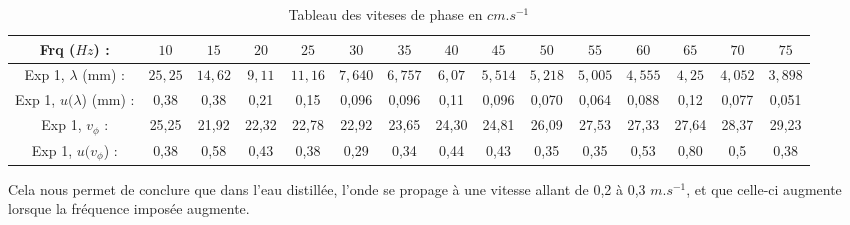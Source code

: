 \documentclass{report}
\begin{document}
\begin{table}[H]
\centering
\caption{Tableau des viteses de phase en $cm.s^{-1}$}
\label{tab:vphi}
\scriptsize{\begin{tabular}{c|c|c|c|c|c|c|c|c|c|c|c|c|c|c}
    Frq ($Hz$) : &  $10$ & $15$ & $20$ & $25$ & $30$ & $35$ & $40$ & $45$ & $50$ & $55$ & $60$ & $65$ & $70$ & $75$ \\
    \hline
    Exp 1, $\lambda$ (mm) : & $25,25$ & $14,62$ & $9,11$ & $11,16$ & $7,640$ & $6,757$ & $6,07$ & $5,514$ & $5,218$ & $5,005$ & $4,555$ & $4,25$ & $4,052$ & $3,898$ \\
    Exp 1, $u(\lambda$) (mm) : & 0,38 & 0,38 & 0,21 & 0,15 & 0,096 & 0,096 & 0,11 & 0,096 & 0,070 & 0,064 &  0,088 & 0,12 & 0,077 & 0,051 \\
    \hline
    Exp 1, $v_{\phi}$ :  & 25,25 & 21,92 & 22,32 & 22,78 & 22,92 & 23,65 & 24,30 & 24,81 & 26,09 & 27,53 & 27,33 & 27,64 & 28,37 & 29,23 \\
    Exp 1, $u(v_{\phi}$) : & 0,38 & 0,58 & 0,43 & 0,38 & 0,29 & 0,34 & 0,44 & 0,43 & 0,35 & 0,35 & 0,53 & 0,80 & 0,5 & 0,38 \\
\end{tabular}}
\end{table}


Cela nous permet de conclure que dans l’eau distillée, l’onde se propage à une vitesse allant de 0,2 à 0,3 $m.s^{-1}$, et que celle-ci augmente lorsque la fréquence imposée augmente. 
\end{document}
